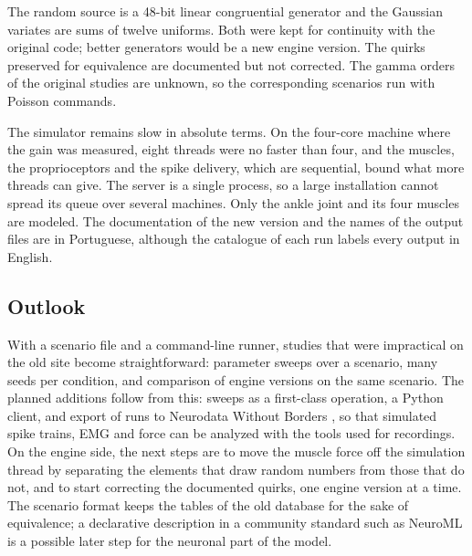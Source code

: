 \documentclass[pdflatex,sn-apa,iicol]{sn-jnl}
\begin{document}
The random source is a 48-bit linear congruential generator and the Gaussian variates are sums of twelve uniforms. Both were kept for continuity with the original code; better generators would be a new engine version. The quirks preserved for equivalence are documented but not corrected. The gamma orders of the original studies are unknown, so the corresponding scenarios run with Poisson commands.

The simulator remains slow in absolute terms. On the four-core machine where the gain was measured, eight threads were no faster than four, and the muscles, the proprioceptors and the spike delivery, which are sequential, bound what more threads can give. The server is a single process, so a large installation cannot spread its queue over several machines. Only the ankle joint and its four muscles are modeled. The documentation of the new version and the names of the output files are in Portuguese, although the catalogue of each run labels every output in English.

\subsection{Outlook}\label{sec:outlook}

With a scenario file and a command-line runner, studies that were impractical on the old site become straightforward: parameter sweeps over a scenario, many seeds per condition, and comparison of engine versions on the same scenario. The planned additions follow from this: sweeps as a first-class operation, a Python client, and export of runs to Neurodata Without Borders \citep{Rubel2022}, so that simulated spike trains, EMG and force can be analyzed with the tools used for recordings. On the engine side, the next steps are to move the muscle force off the simulation thread by separating the elements that draw random numbers from those that do not, and to start correcting the documented quirks, one engine version at a time. The scenario format keeps the tables of the old database for the sake of equivalence; a declarative description in a community standard such as NeuroML \citep{Gleeson2010} is a possible later step for the neuronal part of the model.

\backmatter

\end{document}
